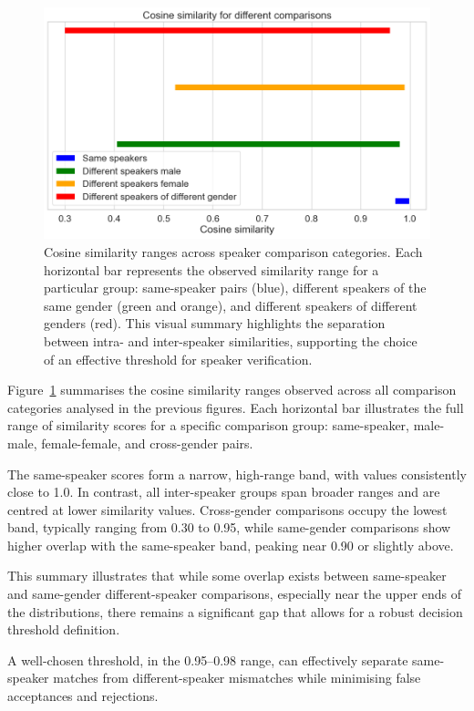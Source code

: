 \documentclass[conference]{IEEEtran}
\begin{document}
\begin{figure}[H]
	\centering
	\includegraphics[width=0.7\linewidth]{img/img-similarity-comparison}
	\caption{Cosine similarity ranges across speaker comparison categories. Each horizontal bar represents the observed similarity range for a particular group: same-speaker pairs (blue), different speakers of the same gender (green and orange), and different speakers of different genders (red). This visual summary highlights the separation between intra- and inter-speaker similarities, supporting the choice of an effective threshold for speaker verification.}
	\label{fig:img-similarity-comparison}
\end{figure}

Figure~\ref{fig:img-similarity-comparison} summarises the cosine similarity ranges observed across all comparison categories analysed in the previous figures. Each horizontal bar illustrates the full range of similarity scores for a specific comparison group: same-speaker, male-male, female-female, and cross-gender pairs.

The same-speaker scores form a narrow, high-range band, with values consistently close to 1.0. In contrast, all inter-speaker groups span broader ranges and are centred at lower similarity values. Cross-gender comparisons occupy the lowest band, typically ranging from 0.30 to 0.95, while same-gender comparisons show higher overlap with the same-speaker band, peaking near 0.90 or slightly above.

This summary illustrates that while some overlap exists between same-speaker and same-gender different-speaker comparisons, especially near the upper ends of the distributions, there remains a significant gap that allows for a robust decision threshold definition.

A well-chosen threshold, in the 0.95–0.98 range, can effectively separate same-speaker matches from different-speaker mismatches while minimising false acceptances and rejections.
\end{document}
